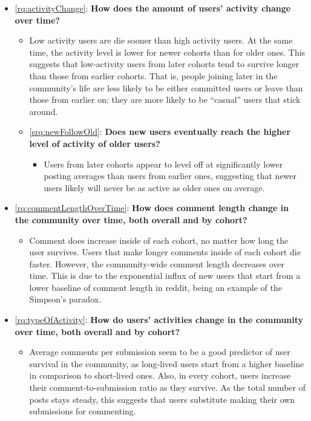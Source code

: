 \begin{itemize}
	\item \ref{rq:activityChange}: \textbf{How does the amount of users' activity change over time?}
	\begin{itemize}
		\item Low activity users are die sooner than high activity users. At the same time, the activity level is lower for newer cohorts than for older ones. This suggests that low-activity users from later cohorts tend to survive longer than those from earlier cohorts.  That is, people joining later in the community's life are less likely to be either committed users or leave than those from earlier on: they are more likely to be ``casual'' users that stick around.

		\item \ref{srq:newFollowOld}: \textbf{Does new users eventually reach the higher level of activity of older users?}
		\begin{itemize}
			\item Users from later cohorts appear to level off at significantly lower posting averages than users from earlier ones, suggesting that newer users likely will never be as active as older ones on average.
	\end{itemize}
	\end{itemize}
	\item \ref{rq:commentLengthOverTime}: \textbf{How does comment length change in the community over time, both overall and by cohort?}
	\begin{itemize}
		\item Comment does increase inside of each cohort, no matter how long the user survives. Users that make longer comments inside of each cohort die faster. However, the community-wide comment length decreases over time. This is due to the exponential influx of new users that start from a lower baseline of comment length in reddit, being an example of the Simpson's paradox.
	\end{itemize}
	\item \ref{rq:typeOfActivity}: \textbf{How do users' activities change in the community over time, both overall and by cohort?}
	\begin{itemize}
		\item Average comments per submission seem to be a good predictor of user survival in the community, as long-lived users start from a higher baseline in comparison to short-lived ones. Also, in every cohort, users increase their comment-to-submission ratio as they survive. As the total number of posts stays steady, this suggests that users substitute making their own submissions for commenting.
	\end{itemize}
\end{itemize}

